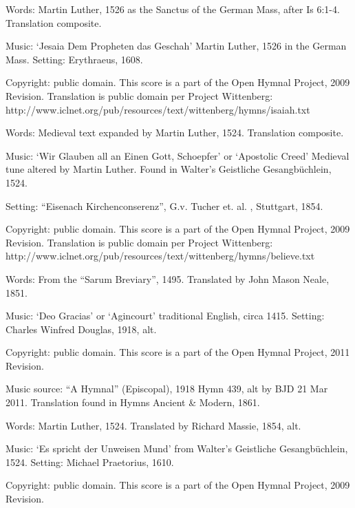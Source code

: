 \begin{multicols}{2}
\par\noindent
Words: Martin Luther, 1526 as the Sanctus of the German Mass, after Is 6:1-4.  Translation composite. 
\par\noindent
Music: `Jesaia Dem Propheten das Geschah' Martin Luther, 1526 in the German Mass.  Setting: Erythraeus, 1608.
\par\noindent
Copyright: public domain. This score is a part of the Open Hymnal Project, 2009 Revision. Translation is public domain per Project Wittenberg: http://www.iclnet.org/pub/resources/text/wittenberg/hymns/isaiah.txt

\par\noindent
Words: Medieval text expanded by Martin Luther, 1524.  Translation composite. 
\par\noindent
Music: `Wir Glauben all an Einen Gott, Schoepfer' or `Apostolic Creed' Medieval tune altered by Martin Luther. Found in Walter's Geistliche Gesangbüchlein, 1524. 
\par\noindent
Setting: ``Eisenach Kirchenconserenz'', G.v. Tucher et. al. , Stuttgart, 1854.
\par\noindent
Copyright: public domain. This score is a part of the Open Hymnal Project, 2009 Revision. Translation is public domain per Project Wittenberg: http://www.iclnet.org/pub/resources/text/wittenberg/hymns/believe.txt

\par\noindent
Words: From the ``Sarum Breviary'', 1495.  Translated by John Mason Neale, 1851.
\par\noindent
Music: `Deo Gracias' or `Agincourt' traditional English, circa 1415.  Setting: Charles Winfred Douglas, 1918, alt.
\par\noindent
Copyright: public domain. This score is a part of the Open Hymnal Project, 2011 Revision.
\par\noindent
Music source: ``A Hymnal'' (Episcopal), 1918 Hymn 439, alt by BJD 21 Mar 2011.  Translation found in Hymns Ancient \& Modern, 1861.

\par\noindent
Words: Martin Luther, 1524. Translated by Richard Massie, 1854, alt. 
\par\noindent
Music: `Es spricht der Unweisen Mund' from Walter's Geistliche Gesangbüchlein, 1524.  Setting: Michael Praetorius, 1610.
\par\noindent
Copyright: public domain. This score is a part of the Open Hymnal Project, 2009 Revision.


\end{multicols}
